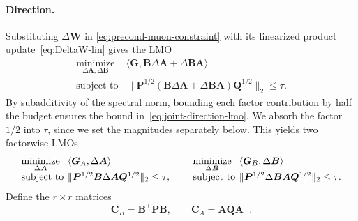 \documentclass{article}
\newcommand{\mat}[1]{\bm{#1}}
\newcommand{\ip}[1]{\langle #1 \rangle}
\newcommand{\norm}[1]{\| #1\|}
\begin{document}
\paragraph{Direction.}
Substituting $\Delta\mat{W}$ in \eqref{eq:precond-muon-constraint} with its linearized product update~\eqref{eq:DeltaW-lin} gives the LMO
\begin{equation}
    \begin{array}{ll}
    \underset{\Delta\mat{A},\Delta\mat{B}}{\mathrm{minimize}} &
    \ip{\mat{G}, \mat{B}\Delta\mat{A}+\Delta\mat{B} \mat{A}} \\[2pt]
    \mbox{subject to} &
    \norm{\mat{P}^{1/2}(\mat{B}\Delta\mat{A}+\Delta\mat{B} \mat{A})\mat{Q}^{1/2}}_2
    \le \tau.
    \end{array}
    \label{eq:joint-direction-lmo}
  \end{equation}
By subadditivity of the spectral norm, bounding each factor
contribution by half the budget ensures the bound
in~\eqref{eq:joint-direction-lmo}.
We absorb the factor $1/2$ into $\tau$, since we set the magnitudes separately below.
This yields two factorwise LMOs
\begin{equation}
\setlength{\arraycolsep}{2pt}
\begin{array}{@{}c@{\qquad}c@{}}
\begin{array}{ll}
\underset{\Delta\mat{A}}{\mathrm{minimize}} &
\ip{\mat{G}_A,\Delta\mat{A}} \\[2pt]
\mbox{subject to} &
\norm{\mat{P}^{1/2}\mat{B}\Delta\mat{A} \mat{Q}^{1/2}}_2 \le \tau,
\end{array}
&
\begin{array}{ll}
\underset{\Delta\mat{B}}{\mathrm{minimize}} &
\ip{\mat{G}_B,\Delta\mat{B}} \\[2pt]
\mbox{subject to} &
\norm{\mat{P}^{1/2}\Delta\mat{B} \mat{A} \mat{Q}^{1/2}}_2 \le \tau .
\end{array}
\end{array}
\label{eq:decoupled-direction-lmo}
\end{equation}
Define the $r\times r$ matrices
\begin{equation}
\mat{C}_B = \mat{B}^\top \mat{P} \mat{B},
\qquad
\mat{C}_A = \mat{A} \mat{Q} \mat{A}^\top .
\label{eq:ours-closure}
\end{equation}
\end{document}
